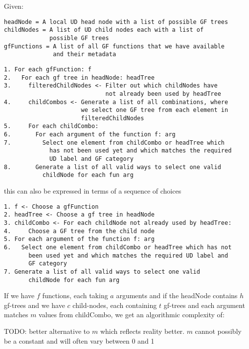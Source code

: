 Given:
\begin{verbatim}
headNode = A local UD head node with a list of possible GF trees
childNodes = A list of UD child nodes each with a list of
             possible GF trees
gfFunctions = A list of all GF functions that we have available
              and their metadata
\end{verbatim}



\begin{verbatim}
1. For each gfFunction: f
2.   For each gf tree in headNode: headTree
3.     filteredChildNodes <- Filter out which childNodes have
                             not already been used by headTree
4.     childCombos <- Generate a list of all combinations, where
                      we select one GF tree from each element in
                      filteredChildNodes
5.     For each childCombo:
6.       For each argument of the function f: arg
7.         Select one element from childCombo or headTree which
             has not been used yet and which matches the required
             UD label and GF category
8.       Generate a list of all valid ways to select one valid
           childNode for each fun arg
\end{verbatim}

this can also be expressed in terms of a sequence of choices

\begin{verbatim}
1. f <- Choose a gfFunction
2. headTree <- Choose a gf tree in headNode
3. childCombo <- For each childNode not already used by headTree:
4.     Choose a GF tree from the child node
5. For each argument of the function f: arg
6.   Select one element from childCombo or headTree which has not
       been used yet and which matches the required UD label and
       GF category
7. Generate a list of all valid ways to select one valid
       childNode for each fun arg
\end{verbatim}

If we have $f$ functions, each taking $a$ arguments and
if the headNode contains $h$ gf-trees
and we have $c$ child-nodes, each containing $t$ gf-trees
and each argument matches $m$ values from childCombo, we get an algorithmic complexity of:

TODO: better alternative to $m$ which reflects reality better. $m$ cannot possibly be a constant and will often vary between 0 and 1

